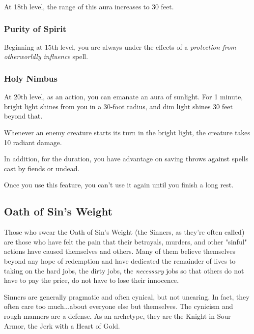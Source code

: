 At 18th level, the range of this aura increases to 30 feet.

\subsubsection{Purity of Spirit}

Beginning at 15th level, you are always under the effects of a \textit{protection from otherworldly influence} spell.

\subsubsection{Holy Nimbus}

At 20th level, as an action, you can emanate an aura of sunlight. For 1 minute, bright light shines from you in a 30-foot radius, and dim light shines 30 feet beyond that.

Whenever an enemy creature starts its turn in the bright light, the creature takes 10 radiant damage.

In addition, for the duration, you have advantage on saving throws against spells cast by fiends or undead.

Once you use this feature, you can't use it again until you finish a long rest.

\subsection{Oath of Sin's Weight}
Those who swear the Oath of Sin's Weight (the Sinners, as they're often called) are those who have felt the pain that their betrayals, murders, and other "sinful" actions have caused themselves and others. Many of them believe themselves beyond any hope of redemption and have dedicated the remainder of lives to taking on the hard jobs, the dirty jobs, the \textit{necessary} jobs so that others do not have to pay the price, do not have to lose their innocence.

Sinners are generally pragmatic and often cynical, but not uncaring. In fact, they often care too much...about everyone else but themselves. The cynicism and rough manners are a defense. As an archetype, they are the Knight in Sour Armor, the Jerk with a Heart of Gold.

